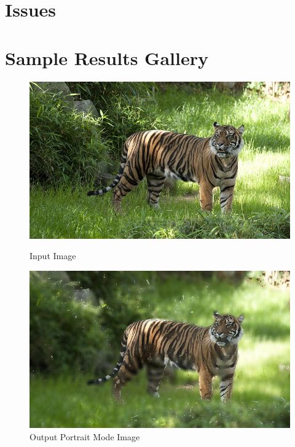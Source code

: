 \documentclass[12pt]{article}
\begin{document}
\section*{Issues}

\newpage

\section*{Sample Results Gallery}

\begin{figure}[!htb]
    \begin{minipage}{0.48\textwidth}
        \centering
        \includegraphics[width=0.9\linewidth]{tiger.jpg}
        \caption{Input Image}
    \end{minipage}\hfill
    \begin{minipage}{0.48\textwidth}
        \centering
        \includegraphics[width=0.9\linewidth]{tiger_portrait.jpg}
        \caption{Output Portrait Mode Image}
    \end{minipage}\hfill
\end{figure}
\end{document}
